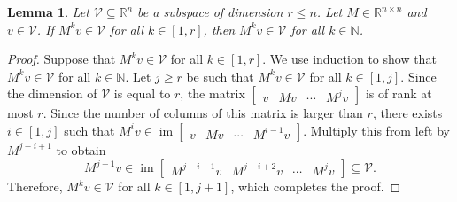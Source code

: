 \documentclass[9pt,shortpaper,twoside,web]{ieeecolor}
\DeclareMathOperator{\im}{im}
\newtheorem{lemma}[theorem]{Lemma}
\begin{document}

\begin{lemma}
\label{lem:imX_-imX_+}
Let $\mathcal{V}\subseteq\mathbb{R}^n$ be a subspace of dimension $r\leq n$. Let $M\in\mathbb{R}^{n\times n}$ and $v\in\mathcal{V}$. If $M^kv\in\mathcal{V}$ for all $k\in[1,r]$, then $M^kv\in\mathcal{V}$ for all $k\in\mathbb{N}$. 
\end{lemma}
\begin{proof}
Suppose that $M^kv\in\mathcal{V}$ for all $k\in[1,r]$. We use induction to show that $M^kv\in\mathcal{V}$ for all $k\in\mathbb{N}$. Let $j\geq r$ be such that $M^{k} v\in \mathcal{V}$ for all $k\in[1,j]$. Since the dimension of $\mathcal{V}$ is equal to $r$, the matrix $\begin{bmatrix}
v & Mv & \cdots & M^{j} v
\end{bmatrix}$ is of rank at most $r$. Since the number of columns of this matrix is larger than $r$, there exists $i\in[1,j]$ such that $M^i v\in\im \begin{bmatrix}
v & Mv & \cdots & M^{i-1} v
\end{bmatrix}$. Multiply this from left by $M^{j-i+1}$ to obtain
\begin{equation}
M^{j+1} v\in\im \begin{bmatrix}
M^{j-i+1}v & M^{j-i+2}v & \cdots & M^j v
\end{bmatrix}\subseteq \mathcal{V}.
\end{equation}
Therefore, $M^{k} v\in \mathcal{V}$ for all $k\in[1,j+1]$, which completes the proof. 
\end{proof}
\end{document}
